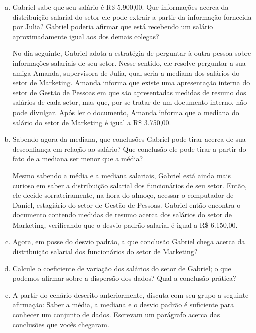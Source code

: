 \documentclass[12pt]{article}
\begin{document}
\begin{enumerate}[a)]
    \item Gabriel sabe que seu salário é R\$ 5.900,00. Que informações acerca da distribuição salarial do setor 
    ele pode extrair a partir da informação fornecida por Julia? Gabriel poderia afirmar que está recebendo um salário aproximadamente igual aos dos demais colegas?
    
    No dia seguinte, Gabriel adota a estratégia de perguntar à outra pessoa sobre informações salariais de seu setor.
    Nesse sentido, ele resolve perguntar a sua amiga Amanda, supervisora de Julia, qual seria a mediana dos salários
    do setor de Marketing. Amanda informa que existe uma apresentação interna do setor de Gestão de Pessoas em que são apresentadas medidas de resumo dos salários de cada setor,
    mas que, por se tratar de um documento interno, não pode divulgar. Após ler o documento, Amanda informa que a mediana do salário do setor de Marketing é igual a R\$ 3.750,00.
    
    \item Sabendo agora da mediana, que conclusões Gabriel pode tirar acerca de sua desconfiança em relação ao salário? Que conclusão ele pode tirar a partir do
    fato de a mediana ser menor que a média? 
    
    Mesmo sabendo a média e a mediana salariais, Gabriel está ainda mais curioso em saber a distribuição salarial dos funcionários de seu setor. 
    Então, ele decide sorrateiramente, na hora do almoço, acessar o computador de Daniel, estagiário do setor de Gestão de Pessoas. Gabriel então encontra o documento contendo
    medidas de resumo acerca dos salários do setor de Marketing, verificando que o desvio padrão salarial é igual a R\$ 6.150,00. 
    
    \item Agora, em posse do desvio padrão, a que conclusão Gabriel chega acerca da distribuição salarial dos funcionários do setor de Marketing? 
    
    \item Calcule o coeficiente de variação dos salários do setor de Gabriel; o que podemos afirmar sobre a dispersão dos dados? Qual a conclusão prática?
    
    \item A partir do cenário descrito anteriormente, discuta com seu grupo a seguinte afirmação: Saber a média, a mediana e o desvio padrão é suficiente para conhecer um conjunto de dados. Escrevam um parágrafo acerca das conclusões que vocês chegaram. 
\end{enumerate}
\end{document}
